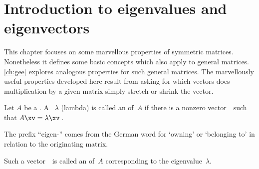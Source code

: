 

\section{Introduction to eigenvalues and eigenvectors}
\label{sec:iee}
\secttoc
{}

\begin{comment}
\pooliv{\S4.1} \layiv{\S5.1} \holti{\S6.1}  \cite[Ch.~8, 11]{Chartier2015}
\end{comment}


This chapter focuses on some marvellous properties of symmetric matrices.  
Nonetheless it defines some basic concepts which also apply to general matrices.  
\cref{ch:gee} explores analogous properties for such general matrices.
The marvellously useful properties developed here result from asking for which vectors does multiplication by a given matrix simply stretch or shrink the vector.


\begin{definition} \label{def:evecval}
Let \(A\) be a .  
A ~\(\lambda\) (lambda) is called an  of~\(A\) if 
there is a nonzero vector~\xv\ such that \(A\xv=\lambda\xv\)\,. 
\begin{aside}
The prefix ``eigen-'' comes from the German word for `owning' or `belonging to' in relation to the originating matrix.
\end{aside}
Such a vector~\xv\ is called an  of~\(A\) corresponding to the eigenvalue~\(\lambda\).   
\end{definition}


